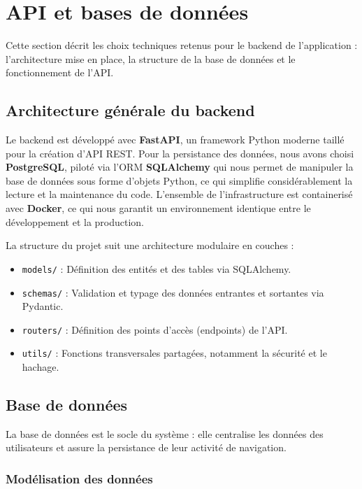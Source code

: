 \section{API et bases de données}
\label{sec:backend}

Cette section décrit les choix techniques retenus pour le backend de l'application : l'architecture mise en place, la structure de la base de données et le fonctionnement de l'API.

\subsection{Architecture générale du backend}

Le backend est développé avec \textbf{FastAPI}, un framework Python moderne taillé pour la création d'API REST. Pour la persistance des données, nous avons choisi \textbf{PostgreSQL}, piloté via l'ORM \textbf{SQLAlchemy} qui nous permet de manipuler la base de données sous forme d'objets Python, ce qui simplifie considérablement la lecture et la maintenance du code. L'ensemble de l'infrastructure est containerisé avec \textbf{Docker}, ce qui nous garantit un environnement identique entre le développement et la production.

La structure du projet suit une architecture modulaire en couches :
\begin{itemize}
    \item \texttt{models/} : Définition des entités et des tables via SQLAlchemy.
    \item \texttt{schemas/} : Validation et typage des données entrantes et sortantes via Pydantic.
    \item \texttt{routers/} : Définition des points d'accès (endpoints) de l'API.
    \item \texttt{utils/} : Fonctions transversales partagées, notamment la sécurité et le hachage.
\end{itemize}

\subsection{Base de données}

La base de données est le socle du système : elle centralise les données des utilisateurs et assure la persistance de leur activité de navigation.

\subsubsection{Modélisation des données}

